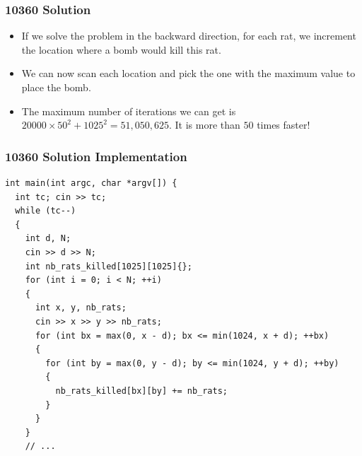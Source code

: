 \documentclass{beamer}
\begin{document}
\begin{frame}
\frametitle{10360 Solution}

\begin{itemize}
\item If we solve the problem in the backward direction, for each rat, we increment the location
where a bomb would kill this rat.

\vspace{0.2cm}

\item<2-> We can now scan each location and pick the one with the maximum value to place the bomb.

\vspace{0.2cm}

\item<3-> The maximum number of iterations we can get is $20000 \times 50^2 + 1025^2 = 51,050,625$. It is
more than $50$ times faster!

\end{itemize}

\end{frame}



\begin{frame}[containsverbatim]
\frametitle{10360 Solution Implementation}
\scriptsize

\begin{lstlisting}
int main(int argc, char *argv[]) {
  int tc; cin >> tc;
  while (tc--)
  {
    int d, N;
    cin >> d >> N;
    int nb_rats_killed[1025][1025]{};
    for (int i = 0; i < N; ++i)
    {
      int x, y, nb_rats;
      cin >> x >> y >> nb_rats;
      for (int bx = max(0, x - d); bx <= min(1024, x + d); ++bx)
      {
        for (int by = max(0, y - d); by <= min(1024, y + d); ++by)
        {
          nb_rats_killed[bx][by] += nb_rats;
        }
      }
    }
    // ...
\end{lstlisting}

\end{frame}
\end{document}

